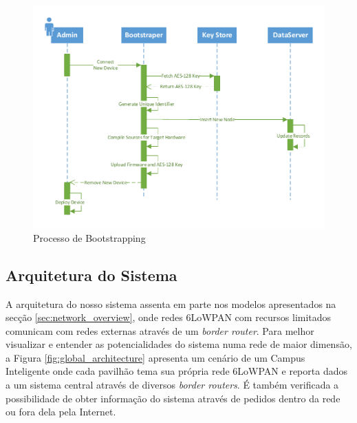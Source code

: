\documentclass{llncs}
\begin{document}
\begin{figure}[h]
  \centering
  \includegraphics[width=0.8\linewidth]{figures/Sequence_Bootstrapping_Reviewed.pdf}
  \caption{Processo de Bootstrapping}
  \label{fig:bootstrapping_process}
\end{figure}

\subsection{Arquitetura do Sistema}
\label{sec:system_architecture}
A arquitetura do nosso sistema assenta em parte nos modelos apresentados na secção \ref{sec:network_overview}, onde redes \ac{6LoWPAN} com recursos limitados comunicam com redes externas através de um \textit{border router}.
Para melhor visualizar e entender as potencialidades do sistema numa rede de maior dimensão, a Figura \ref{fig:global_architecture} apresenta um cenário de um Campus Inteligente onde cada pavilhão tema sua própria rede 6LoWPAN e reporta dados a um sistema central através de diversos \textit{border routers}. É também verificada a possibilidade de obter informação do sistema através de pedidos dentro da rede ou fora dela pela Internet.
\end{document}
